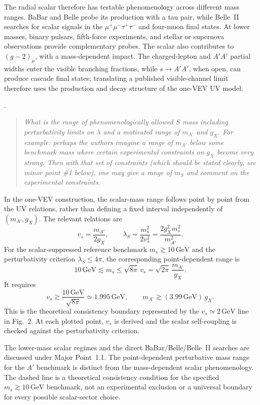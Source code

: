 \documentclass[12pt,a4paper]{article}
\begin{document}
The radial scalar therefore has testable phenomenology across different mass ranges. BaBar and Belle probe its production with a tau pair, while Belle~II searches for scalar signals in the \(\mu^+\mu^-\tau^+\tau^-\) and four-muon final states. At lower masses, binary pulsars, fifth-force experiments, and stellar or supernova observations provide complementary probes. The scalar also contributes to \((g-2)_\mu\), with a mass-dependent impact. The charged-lepton and \(A'A'\) partial widths enter the visible branching fractions, while \(s\to A'A'\), when open, can produce cascade final states; translating a published visible-channel limit therefore uses the production and decay structure of the one-VEV UV model.

\medskip

. \begin{quote}\itshape
What is the range of phenomenologically allowed \(S\) mass including perturbativity limits on \(\lambda\) and a motivated range of \(m_{A'}\) and \(g_X\). For example: perhaps the authors imagine a range of \(m_{A'}\) below some benchmark mass where certain experimental constraints on \(g_X\) become very strong. Then with that set of constraints (which should be stated clearly, see minor point \#1 below), one may give a range of \(m_S\) and comment on the experimental constraints.\end{quote}

In the one-VEV construction, the scalar-mass range follows point by point from the UV relations, rather than defining a fixed interval independently of \((m_{A'},g_X)\). The relevant relations are
\[
v_s=\frac{m_{A'}}{2g_X},
\qquad
\lambda_S=\frac{m_s^2}{2v_s^2}
=\frac{2g_X^2m_s^2}{m_{A'}^2}.
\]
For the scalar-suppressed reference benchmark \(m_s\gtrsim10\,\mathrm{GeV}\) and the perturbativity criterion \(\lambda_S\leq4\pi\), the corresponding point-dependent range is
\[
10\,\mathrm{GeV}\lesssim m_s\leq\sqrt{8\pi}\,v_s
=\sqrt{2\pi}\,\frac{m_{A'}}{g_X}.
\]
It requires
\[
v_s\gtrsim\frac{10\,\mathrm{GeV}}{\sqrt{8\pi}}
\simeq1.995\,\mathrm{GeV},
\qquad
m_{A'}\gtrsim(3.99\,\mathrm{GeV})\,g_X.
\]
This is the theoretical consistency boundary represented by the \(v_s\simeq2\,\mathrm{GeV}\) line in Fig.~2. At each plotted point, \(v_s\) is derived and the scalar self-coupling is checked against the perturbativity criterion.

The lower-mass scalar regimes and the direct BaBar/Belle/Belle~II searches are discussed under Major Point~1.1. The point-dependent perturbative mass range for the \(A'\) benchmark is distinct from the mass-dependent scalar phenomenology. The dashed line is a theoretical consistency condition for the specified \(m_s\gtrsim10\,\mathrm{GeV}\) benchmark, not an experimental exclusion or a universal boundary for every possible scalar-sector choice.
\end{document}
